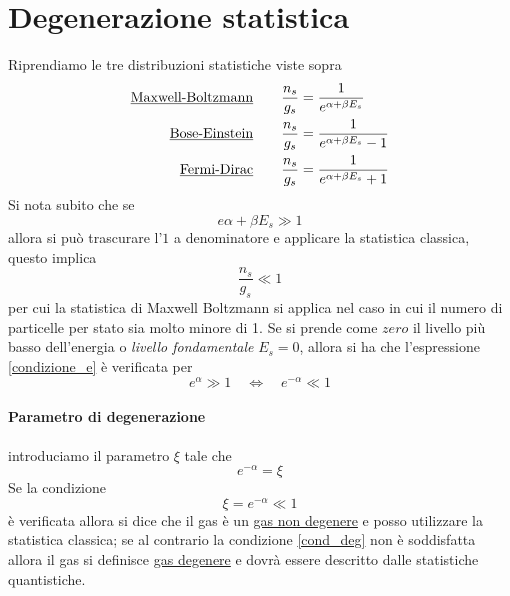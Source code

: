 
\section{Degenerazione statistica}
Riprendiamo le tre distribuzioni statistiche viste sopra
\begin{equation}
\begin{split}
\mbox{\underline{Maxwell-Boltzmann}}  \quad\quad  \frac{n_s}{g_s} & = \frac{1}{e^{\alpha + \beta E_s}} \\
\mbox{\underline{Bose-Einstein}}  \quad\quad  \frac{n_s}{g_s} & = \frac{1}{e^{\alpha + \beta E_s} - 1} \\
\mbox{\underline{Fermi-Dirac}}  \quad\quad  \frac{n_s}{g_s} & = \frac{1}{e^{\alpha + \beta E_s} + 1 } 
\end{split}
\end{equation}
Si nota subito che se 
\begin{equation}
e{\alpha + \beta E_s} \gg 1
\label{condizione_e}
\end{equation}
allora si può trascurare l'$1$ a denominatore e applicare la statistica classica, questo implica
\begin{equation}
\frac{n_s}{g_s} \ll 1
\end{equation}
per cui la statistica di Maxwell Boltzmann si applica nel caso in cui il numero di particelle per stato sia molto minore di 1.
Se si prende come $zero$ il livello più basso dell'energia o \textit{livello fondamentale} $E_s = 0$, allora si ha che l'espressione \ref{condizione_e} è verificata per
\begin{equation}
e^{\alpha} \gg 1 \quad\Leftrightarrow\quad  e^{-\alpha} \ll 1
\end{equation}

\paragraph{Parametro di degenerazione} introduciamo il parametro $\xi$ tale che 
\begin{equation}
e^{-\alpha} = \xi 
\end{equation}
Se la condizione 
\begin{equation}
\xi = e^{-\alpha} \ll 1
\label{cond_deg}
\end{equation}
è verificata allora si dice che il gas è un \underline{gas non degenere} e posso utilizzare la statistica classica;
se al contrario la condizione \ref{cond_deg} non è soddisfatta allora il gas si definisce \underline{gas degenere} e dovrà essere descritto dalle statistiche quantistiche.

